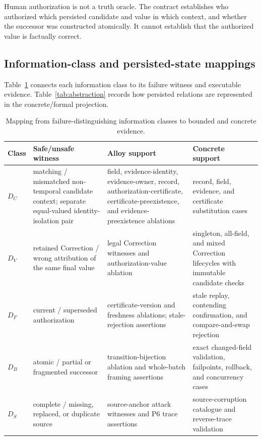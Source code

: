 \documentclass[11pt,a4paper]{article}
\begin{document}
Human authorization is not a truth oracle. The contract establishes who authorized which persisted candidate and value in which context, and whether the successor was constructed atomically. It cannot establish that the authorized value is factually correct.




\subsection{Information-class and persisted-state mappings}
Table~\ref{tab:distinction-evidence} connects each information class to its failure witness and executable evidence. Table~\ref{tab:abstraction} records how persisted relations are represented in the concrete/formal projection.
\begin{table}[t]
\centering
\footnotesize
\caption{Mapping from failure-distinguishing information classes to bounded and concrete evidence.}
\label{tab:distinction-evidence}
\begin{tabularx}{\textwidth}{@{}l>{\raggedright\arraybackslash}p{}>{\raggedright\arraybackslash}p{}>{\raggedright\arraybackslash}X@{}}
\toprule
Class & Safe/unsafe witness & Alloy support & Concrete support \\
\midrule
$D_C$ & matching / mismatched non-temporal candidate context; separate equal-valued identity-isolation pair & field, evidence-identity, evidence-owner, record, authorization-certificate, certificate-preexistence, and evidence-preexistence ablations & record, field, evidence, and certificate substitution cases \\
$D_V$ & retained Correction / wrong attribution of the same final value & legal Correction witnesses and authorization-value ablation & singleton, all-field, and mixed Correction lifecycles with immutable candidate checks \\
$D_F$ & current / superseded authorization & certificate-version and freshness ablations; stale-rejection assertions & stale replay, contending confirmation, and compare-and-swap rejection \\
$D_B$ & atomic / partial or fragmented successor & transition-bijection ablation and whole-batch framing assertions & exact changed-field validation, failpoints, rollback, and concurrency cases \\
$D_S$ & complete / missing, replaced, or duplicate source & source-anchor attack witnesses and P6 trace assertions & source-corruption catalogue and reverse-trace validation \\
\bottomrule
\end{tabularx}
\end{table}
\end{document}
